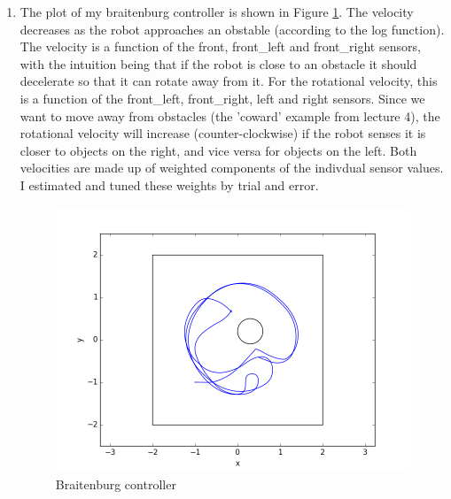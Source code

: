 \documentclass[12pt,a4paper]{article}
\begin{document}
\begin{enumerate}[label=(\alph*)]
        \item The plot of my braitenburg controller is shown in Figure \ref{fig:braitenburg}. The velocity decreases as the robot approaches an obstable (according to the log function). The velocity is a function of the front, front\_left and front\_right sensors, with the intuition being that if the robot is close to an obstacle it should decelerate so that it can rotate away from it. For the rotational velocity, this is a function of the front\_left, front\_right, left and right sensors. Since we want to move away from obstacles (the 'coward' example from lecture 4), the rotational velocity will increase (counter-clockwise) if the robot senses it is closer to objects on the right, and vice versa for objects on the left. Both velocities are made up of weighted components of the indivdual sensor values. I estimated and tuned these weights by trial and error.
		\begin{figure}[h]
			\centering
			\includegraphics[width=\textwidth]{fig/2a.png}
			\caption{Braitenburg controller}
			\label{fig:braitenburg}
		\end{figure}


\end{enumerate}
\end{document}
